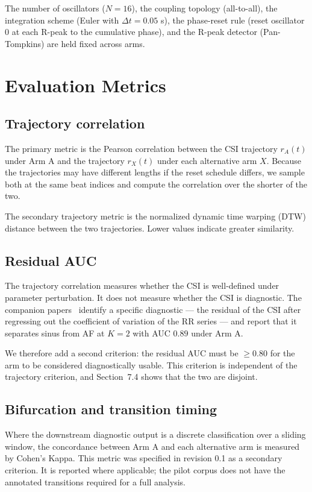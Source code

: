 \documentclass[11pt]{article}
\begin{document}
The number of oscillators ($N = 16$), the coupling topology
(all-to-all), the integration scheme (Euler with $\Delta t = 0.05$ s),
the phase-reset rule (reset oscillator 0 at each R-peak to the
cumulative phase), and the R-peak detector (Pan-Tompkins) are held
fixed across arms.

\section{Evaluation Metrics}

\subsection{Trajectory correlation}

The primary metric is the Pearson correlation between the CSI
trajectory $r_A(t)$ under Arm A and the trajectory $r_X(t)$ under each
alternative arm $X$. Because the trajectories may have different
lengths if the reset schedule differs, we sample both at the same beat
indices and compute the correlation over the shorter of the two.

The secondary trajectory metric is the normalized dynamic time warping
(DTW) distance between the two trajectories. Lower values indicate
greater similarity.

\subsection{Residual AUC}

The trajectory correlation measures whether the CSI is well-defined
under parameter perturbation. It does not measure whether the CSI is
diagnostic. The companion papers~\cite{simoes2026residual} identify a
specific diagnostic --- the residual of the CSI after regressing out
the coefficient of variation of the RR series --- and report that it
separates sinus from AF at $K = 2$ with AUC $0.89$ under Arm A.

We therefore add a second criterion: the residual AUC must be $\geq
0.80$ for the arm to be considered diagnostically usable. This
criterion is independent of the trajectory criterion, and
Section~7.4 shows that the two are disjoint.

\subsection{Bifurcation and transition timing}

Where the downstream diagnostic output is a discrete classification
over a sliding window, the concordance between Arm A and each
alternative arm is measured by Cohen's Kappa. This metric was specified
in revision 0.1 as a secondary criterion. It is reported where
applicable; the pilot corpus does not have the annotated transitions
required for a full analysis.
\end{document}

